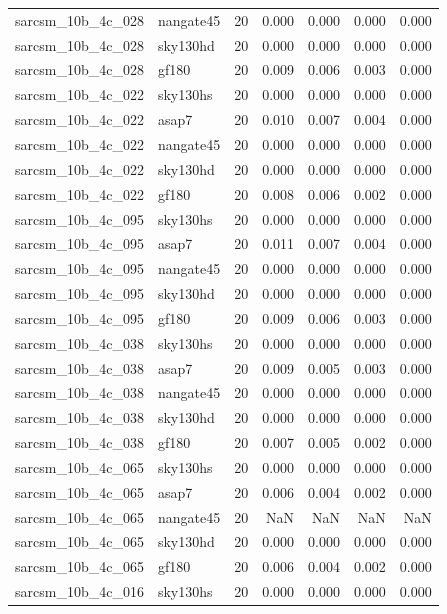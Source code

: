 \begin{tabular}{llrrrrr}
sarcsm\_10b\_4c\_028 & nangate45 & 20 & 0.000 & 0.000 & 0.000 & 0.000 \\
sarcsm\_10b\_4c\_028 & sky130hd & 20 & 0.000 & 0.000 & 0.000 & 0.000 \\
sarcsm\_10b\_4c\_028 & gf180 & 20 & 0.009 & 0.006 & 0.003 & 0.000 \\
sarcsm\_10b\_4c\_022 & sky130hs & 20 & 0.000 & 0.000 & 0.000 & 0.000 \\
sarcsm\_10b\_4c\_022 & asap7 & 20 & 0.010 & 0.007 & 0.004 & 0.000 \\
sarcsm\_10b\_4c\_022 & nangate45 & 20 & 0.000 & 0.000 & 0.000 & 0.000 \\
sarcsm\_10b\_4c\_022 & sky130hd & 20 & 0.000 & 0.000 & 0.000 & 0.000 \\
sarcsm\_10b\_4c\_022 & gf180 & 20 & 0.008 & 0.006 & 0.002 & 0.000 \\
sarcsm\_10b\_4c\_095 & sky130hs & 20 & 0.000 & 0.000 & 0.000 & 0.000 \\
sarcsm\_10b\_4c\_095 & asap7 & 20 & 0.011 & 0.007 & 0.004 & 0.000 \\
sarcsm\_10b\_4c\_095 & nangate45 & 20 & 0.000 & 0.000 & 0.000 & 0.000 \\
sarcsm\_10b\_4c\_095 & sky130hd & 20 & 0.000 & 0.000 & 0.000 & 0.000 \\
sarcsm\_10b\_4c\_095 & gf180 & 20 & 0.009 & 0.006 & 0.003 & 0.000 \\
sarcsm\_10b\_4c\_038 & sky130hs & 20 & 0.000 & 0.000 & 0.000 & 0.000 \\
sarcsm\_10b\_4c\_038 & asap7 & 20 & 0.009 & 0.005 & 0.003 & 0.000 \\
sarcsm\_10b\_4c\_038 & nangate45 & 20 & 0.000 & 0.000 & 0.000 & 0.000 \\
sarcsm\_10b\_4c\_038 & sky130hd & 20 & 0.000 & 0.000 & 0.000 & 0.000 \\
sarcsm\_10b\_4c\_038 & gf180 & 20 & 0.007 & 0.005 & 0.002 & 0.000 \\
sarcsm\_10b\_4c\_065 & sky130hs & 20 & 0.000 & 0.000 & 0.000 & 0.000 \\
sarcsm\_10b\_4c\_065 & asap7 & 20 & 0.006 & 0.004 & 0.002 & 0.000 \\
sarcsm\_10b\_4c\_065 & nangate45 & 20 & NaN & NaN & NaN & NaN \\
sarcsm\_10b\_4c\_065 & sky130hd & 20 & 0.000 & 0.000 & 0.000 & 0.000 \\
sarcsm\_10b\_4c\_065 & gf180 & 20 & 0.006 & 0.004 & 0.002 & 0.000 \\
sarcsm\_10b\_4c\_016 & sky130hs & 20 & 0.000 & 0.000 & 0.000 & 0.000 \\

\end{tabular}
